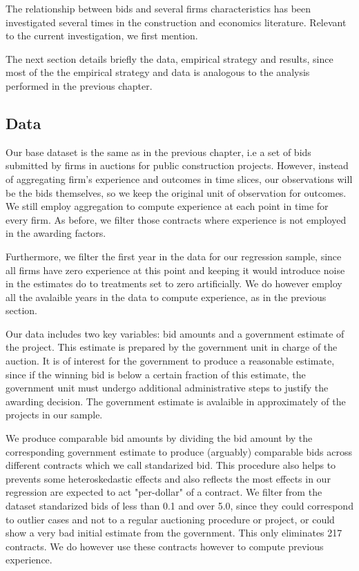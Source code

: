 The relationship between bids and several firms characteristics has been investigated several times in the construction and economics literature. Relevant to the current investigation, we first mention.

The next section details briefly the data, empirical strategy and results, since most of the the empirical strategy and data is analogous to the analysis performed in the previous chapter.

\subsection{Data}
Our base dataset is the same as in the previous chapter, i.e a set of bids submitted by firms in auctions for public construction projects. However, instead of aggregating firm's experience and outcomes in time slices, our observations will be the bids themselves, so we keep the original unit of observation for outcomes. We still employ aggregation to compute experience at each point in time for every firm. As before, we filter those contracts where experience is not employed in the awarding factors.

Furthermore, we filter the first year in the data for our regression sample, since all firms have zero experience at this point and keeping it would introduce noise in the estimates do to treatments set to zero artificially. We do however employ all the avalaible years in the data to compute experience, as in the previous section.

Our data includes two key variables: bid amounts and a government estimate of the project. This estimate is prepared by the government unit in charge of the auction. It is of interest for the government to produce a reasonable estimate, since if the winning bid is below a certain fraction of this estimate, the government unit must undergo additional administrative steps to justify the awarding decision. The government estimate is avalaible in approximately of the projects in our sample.

We produce comparable bid amounts by dividing the bid amount by the corresponding government estimate to produce (arguably) comparable bids across different contracts which we call standarized bid. This procedure also helps to prevents some heteroskedastic effects and also reflects the most effects in our regression are expected to act "per-dollar" of a contract. We filter from the dataset standarized bids of less than 0.1 and over 5.0, since they could correspond to outlier cases and not to a regular auctioning procedure or project, or could show a very bad initial estimate from the government. This only eliminates 217 contracts. We do however use these contracts however to compute previous experience.

